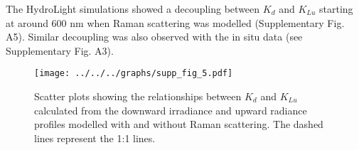 \documentclass[10pt]{article}
\newcommand{\ked}{\ensuremath{K_{d}}}
\newcommand{\klu}{\ensuremath{K_{Lu}}}
\newcommand{\edz}{\ensuremath{{E_d(z)}}}
\newcommand{\edzero}{\ensuremath{{E_d(0^-)}}}
\newcommand{\edzkd}{\ensuremath{{E_d^{K_d}(z)}}}
\newcommand{\luzkd}{\ensuremath{{E_d^{K_{Lu}}(z)}}}
\begin{document}
The HydroLight simulations showed a decoupling between \ked{} and \klu{} starting at around 600 nm when Raman scattering was modelled (Supplementary Fig. A5). Similar decoupling was also observed with the in situ data (see Supplementary Fig. A3).

\begin{figure}[H]
	\centering
	\texttt{[image: ../../../graphs/supp\_fig\_5.pdf]}
	\caption{Scatter plots showing the relationships between \ked{} and \klu{} calculated from the downward irradiance and upward radiance profiles modelled with and without Raman scattering. The dashed lines represent the 1:1 lines.}
\end{figure}









\clearpage
\printbibliography
\end{document}
